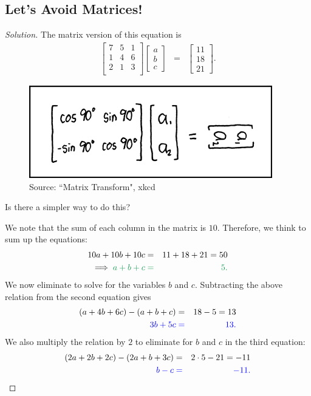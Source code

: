 \subsection{Let's Avoid Matrices!}
\begin{proof}[Solution] The matrix version of this equation is \begin{eqnarray*} \begin{bmatrix}
	7 & 5 & 1 \\ 
	1 & 4 & 6 \\ 
	2 & 1 & 3 \\ 
\end{bmatrix} \begin{bmatrix} a \\ b \\ c \end{bmatrix} &=& \begin{bmatrix} 11 \\ 18 \\ 21 \end{bmatrix}. \end{eqnarray*}

\begin{figure}[h]
	\centering\includegraphics[width=0.3\linewidth]{images/xkcd.png}
	\caption{Source: ``Matrix Transform", xkcd}
\end{figure}

Is there a simpler way to do this?

\clearpage

We note that the sum of each column in the matrix is $10$. Therefore, we think to sum up the equations: \begin{eqnarray*} 10a+10b+10c&=&11+18+21=50 \\ \implies \color{ForestGreen} a+b+c&\color{ForestGreen} =&\color{ForestGreen} 5. \end{eqnarray*} We now eliminate to solve for the variables $b$ and $c$. Subtracting the above relation from the second equation gives \begin{eqnarray*} \left(a+4b+6c\right)-\left(a+b+c\right)&=&18-5=13 \\ \color{blue} 3b+5c &\color{blue}=& \color{blue} 13.\end{eqnarray*} We also multiply the relation by $2$ to eliminate for $b$ and $c$ in the third equation: \begin{eqnarray*} \left(2a+2b+2c\right)-\left(2a+b+3c\right) &=& 2\cdot 5-21=-11 \\ \color{blue} b-c &\color{blue}=&\color{blue} -11. \end{eqnarray*}


\end{proof}
